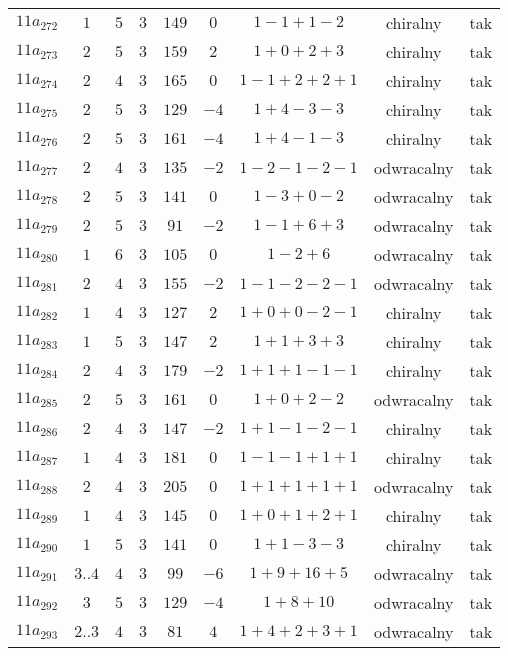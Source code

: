 \begin{longtable}{ccccccccc}
$11a_{272}$ & $1$ & $5$ & $3$ & $149$ & $0$ & $1-1+1-2$ & chiralny & tak \\
$11a_{273}$ & $2$ & $5$ & $3$ & $159$ & $2$ & $1+0+2+3$ & chiralny & tak \\
$11a_{274}$ & $2$ & $4$ & $3$ & $165$ & $0$ & $1-1+2+2+1$ & chiralny & tak \\
$11a_{275}$ & $2$ & $5$ & $3$ & $129$ & $-4$ & $1+4-3-3$ & chiralny & tak \\
$11a_{276}$ & $2$ & $5$ & $3$ & $161$ & $-4$ & $1+4-1-3$ & chiralny & tak \\
$11a_{277}$ & $2$ & $4$ & $3$ & $135$ & $-2$ & $1-2-1-2-1$ & odwracalny & tak \\
$11a_{278}$ & $2$ & $5$ & $3$ & $141$ & $0$ & $1-3+0-2$ & odwracalny & tak \\
$11a_{279}$ & $2$ & $5$ & $3$ & $91$ & $-2$ & $1-1+6+3$ & odwracalny & tak \\
$11a_{280}$ & $1$ & $6$ & $3$ & $105$ & $0$ & $1-2+6$ & odwracalny & tak \\
$11a_{281}$ & $2$ & $4$ & $3$ & $155$ & $-2$ & $1-1-2-2-1$ & odwracalny & tak \\
$11a_{282}$ & $1$ & $4$ & $3$ & $127$ & $2$ & $1+0+0-2-1$ & chiralny & tak \\
$11a_{283}$ & $1$ & $5$ & $3$ & $147$ & $2$ & $1+1+3+3$ & chiralny & tak \\
$11a_{284}$ & $2$ & $4$ & $3$ & $179$ & $-2$ & $1+1+1-1-1$ & chiralny & tak \\
$11a_{285}$ & $2$ & $5$ & $3$ & $161$ & $0$ & $1+0+2-2$ & odwracalny & tak \\
$11a_{286}$ & $2$ & $4$ & $3$ & $147$ & $-2$ & $1+1-1-2-1$ & chiralny & tak \\
$11a_{287}$ & $1$ & $4$ & $3$ & $181$ & $0$ & $1-1-1+1+1$ & chiralny & tak \\
$11a_{288}$ & $2$ & $4$ & $3$ & $205$ & $0$ & $1+1+1+1+1$ & odwracalny & tak \\
$11a_{289}$ & $1$ & $4$ & $3$ & $145$ & $0$ & $1+0+1+2+1$ & chiralny & tak \\
$11a_{290}$ & $1$ & $5$ & $3$ & $141$ & $0$ & $1+1-3-3$ & chiralny & tak \\
$11a_{291}$ & $3..4$ & $4$ & $3$ & $99$ & $-6$ & $1+9+16+5$ & odwracalny & tak \\
$11a_{292}$ & $3$ & $5$ & $3$ & $129$ & $-4$ & $1+8+10$ & odwracalny & tak \\
$11a_{293}$ & $2..3$ & $4$ & $3$ & $81$ & $4$ & $1+4+2+3+1$ & odwracalny & tak \\

\end{longtable}
